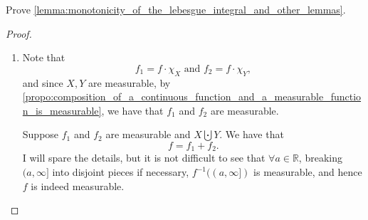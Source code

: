 \documentclass[notoc,notitlepage]{tufte-book}
\begin{document}
\begin{ex}
  Prove \cref{lemma:monotonicity_of_the_lebesgue_integral_and_other_lemmas}.
\end{ex}

\begin{proof}
  \begin{enumerate}
    \item {}
      \hlbnotea{($\implies$)} Note that
      \begin{equation*}
        f_1 = f \cdot \chi_X \text{ and } f_2 = f \cdot \chi_Y,
      \end{equation*}
      and since $X, Y$ are measurable, by
      \cref{propo:composition_of_a_continuous_function_and_a_measurable_function_is_measurable},
      we have that $f_1$ and $f_2$ are measurable.

      \hlbnotea{($\impliedby$)} Suppose $f_1$ and $f_2$ are measurable and $X
      \bigcupdot Y$. We have that
      \begin{equation*}
        f = f_1 + f_2.
      \end{equation*}
      I will spare the details, but it is not difficult to see that $\forall a
      \in \mathbb{R}$, breaking $(a, \infty]$ into disjoint pieces if necessary,
      $f^{-1}((a, \infty])$ is measurable, and hence $f$ is indeed measurable.


\end{enumerate}
\end{proof}
\end{document}
